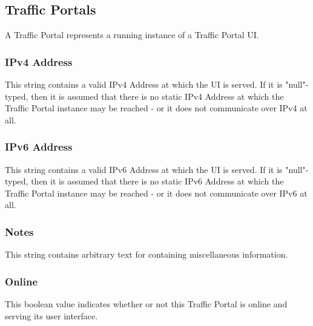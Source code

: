 %
%

\subsection{Traffic Portals}
A Traffic Portal represents a running instance of a Traffic Portal UI.

\subsubsection{IPv4 Address}
This string contains a valid IPv4 Address at which the UI is served. If it is
"null"-typed, then it is assumed that there is no static IPv4 Address at which
the Traffic Portal instance may be reached - or it does not communicate over
IPv4 at all.

\subsubsection{IPv6 Address}
This string contains a valid IPv6 Address at which the UI is served. If it is
"null"-typed, then it is assumed that there is no static IPv6 Address at which
the Traffic Portal instance may be reached - or it does not communicate over
IPv6 at all.

\subsubsection{Notes}
This string contains arbitrary text for containing miscellaneous information.

\subsubsection{Online}
This boolean value indicates whether or not this Traffic Portal is online and
serving its user interface.

